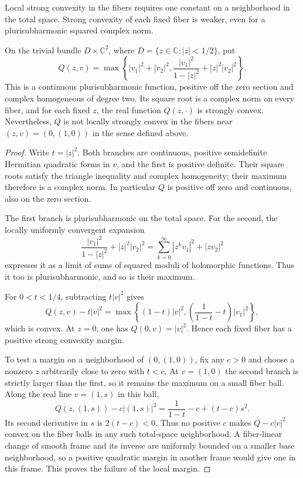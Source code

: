 Local strong convexity in the fibers requires one constant on a
neighborhood in the total space. Strong convexity of each fixed
fiber is weaker, even for a plurisubharmonic squared complex norm.

\begin{example}\label{ex:fiberwise-convexity-without-local-margin}
On the trivial bundle $D\times\mathbb C^2$, where
$D=\{z\in\mathbb C:|z|<1/2\}$, put
\[
 Q(z,v)=\max\left\{
 |v_1|^2+|v_2|^2,
 \frac{|v_1|^2}{1-|z|^2}+|z|^2|v_2|^2
 \right\}.
\]
This is a continuous plurisubharmonic function, positive off
the zero section and complex homogeneous of degree two.
Its square root is a complex norm on every fiber, and for each
fixed $z$, the real function $Q(z,\cdot)$ is strongly convex. Nevertheless,
$Q$ is not locally strongly convex in the fibers near
$(z,v)=(0,(1,0))$ in the sense defined above.
\end{example}
\begin{proof}
Write $t=|z|^2$. Both branches are continuous, positive
semidefinite Hermitian quadratic forms in $v$, and the first
is positive definite. Their square roots satisfy the triangle
inequality and complex homogeneity; their maximum therefore
is a complex norm. In particular $Q$ is positive off zero and
continuous, also on the zero section.

The first branch is plurisubharmonic on the total space.
For the second, the locally uniformly convergent expansion
\[
 \frac{|v_1|^2}{1-|z|^2}+|z|^2|v_2|^2
   =\sum_{k=0}^{\infty}|z^kv_1|^2+|zv_2|^2
\]
expresses it as a limit of sums of squared moduli of holomorphic
functions. Thus it too is plurisubharmonic, and so is their
maximum.

For $0<t<1/4$, subtracting $t|v|^2$ gives
\[
 Q(z,v)-t|v|^2
 =\max\left\{(1-t)|v|^2,
       \left(\frac1{1-t}-t\right)|v_1|^2\right\},
\]
which is convex. At $z=0$, one has $Q(0,v)=|v|^2$.
Hence each fixed fiber has a positive strong convexity margin.

To test a margin on a neighborhood of $(0,(1,0))$, fix any
$c>0$ and choose a nonzero $z$ arbitrarily close to zero with
$t<c$. At $v=(1,0)$ the second branch is strictly larger than
the first, so it remains the maximum on a small fiber ball.
Along the real line $v=(1,s)$ in this ball,
\[
 Q(z,(1,s))-c|(1,s)|^2
   =\frac1{1-t}-c+(t-c)s^2.
\]
Its second derivative in $s$ is $2(t-c)<0$. Thus no positive $c$ makes
$Q-c|v|^2$ convex on the fiber balls in any such total-space
neighborhood. A fiber-linear change of smooth frame and its
inverse are uniformly bounded on a smaller base neighborhood,
so a positive quadratic margin in another frame would give
one in this frame. This proves the failure of the local margin.
\end{proof}
